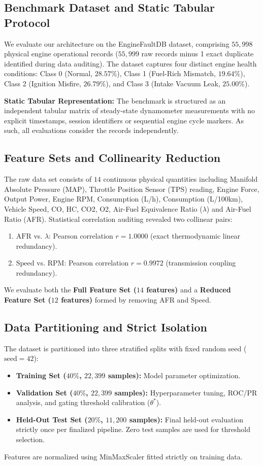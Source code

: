 \documentclass[journal]{IEEEtran}
\begin{document}
\subsection{Benchmark Dataset and Static Tabular Protocol}
We evaluate our architecture on the EngineFaultDB dataset, comprising $55,998$ physical engine operational records ($55,999$ raw records minus 1 exact duplicate identified during data auditing). The dataset captures four distinct engine health conditions: Class 0 (Normal, $28.57\%$), Class 1 (Fuel-Rich Mismatch, $19.64\%$), Class 2 (Ignition Misfire, $26.79\%$), and Class 3 (Intake Vacuum Leak, $25.00\%$).

\textbf{Static Tabular Representation:} The benchmark is structured as an independent tabular matrix of steady-state dynamometer measurements with no explicit timestamps, session identifiers or sequential engine cycle markers. As such, all evaluations consider the records independently.

\subsection{Feature Sets and Collinearity Reduction}
The raw data set consists of $14$ continuous physical quantities including Manifold Absolute Pressure (MAP), Throttle Position Sensor (TPS) reading, Engine Force, Output Power, Engine RPM, Consumption (L/h), Consumption (L/100km), Vehicle Speed, CO, HC, CO2, O2, Air-Fuel Equivalence Ratio ($\lambda$) and Air-Fuel Ratio (AFR). Statistical correlation auditing revealed two collinear pairs:
\begin{enumerate}
    \item $\text{AFR}$ vs. $\lambda$: Pearson correlation $r = 1.0000$ (exact thermodynamic linear redundancy).
    \item $\text{Speed}$ vs. $\text{RPM}$: Pearson correlation $r = 0.9972$ (transmission coupling redundancy).
\end{enumerate}
We evaluate both the \textbf{Full Feature Set ($14$ features)} and a \textbf{Reduced Feature Set ($12$ features)} formed by removing AFR and Speed.

\subsection{Data Partitioning and Strict Isolation}
The dataset is partitioned into three stratified splits with fixed random seed ($\text{seed}=42$):
\begin{itemize}
    \item \textbf{Training Set ($40\%$, $22,399$ samples):} Model parameter optimization.
    \item \textbf{Validation Set ($40\%$, $22,399$ samples):} Hyperparameter tuning, ROC/PR analysis, and gating threshold calibration ($\theta^*$).
    \item \textbf{Held-Out Test Set ($20\%$, $11,200$ samples):} Final held-out evaluation strictly once per finalized pipeline. Zero test samples are used for threshold selection.
\end{itemize}
Features are normalized using MinMaxScaler fitted strictly on training data.
\end{document}
